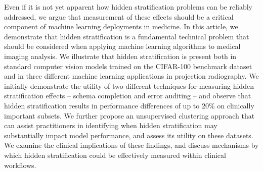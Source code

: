 \documentclass{article}
\begin{document}
Even if it is not yet apparent how hidden stratification problems can be reliably addressed, we argue that measurement of these effects should be a critical component of machine learning deployments in medicine.  
In this article, we demonstrate that hidden stratification is a fundamental technical problem that should be considered when applying machine learning algorithms to medical imaging analysis.  
We illustrate that hidden stratification is present both in standard computer vision models trained on the CIFAR-100 benchmark dataset and in three different machine learning applications in projection radiography.  
We initially demonstrate the utility of two different techniques for measuring hidden stratification effects -- schema completion and error auditing -- and observe that hidden stratification results in performance differences of up to 20\% on clinically important subsets.  
We further propose an unsupervised clustering approach that can assist practitioners in identifying when hidden stratification may substantially impact model performance, and assess its utility on these datasets.
We examine the clinical implications of these findings, and discuss mechanisms by which hidden stratification could be effectively measured within clinical workflows.
\end{document}
